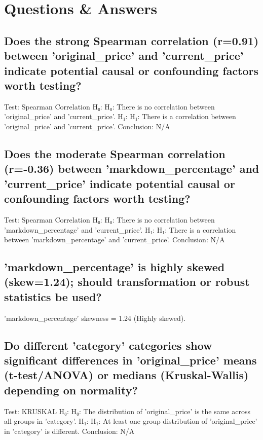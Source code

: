 \documentclass{article}%
\begin{document}
%
\section{Questions \& Answers}%
\label{sec:QuestionsAnswers}%
\subsection{Does the strong Spearman correlation (r=0.91) between 'original\_price' and 'current\_price' indicate potential causal or confounding factors worth testing?}%
\label{subsec:DoesthestrongSpearmancorrelation(r=0.91)betweenoriginalpriceandcurrentpriceindicatepotentialcausalorconfoundingfactorsworthtesting?}%
Test: Spearman Correlation\newline%
H₀: H₀: There is no correlation between 'original\_price' and 'current\_price'.\newline%
H₁: H₁: There is a correlation between 'original\_price' and 'current\_price'.\newline%
Conclusion: N/A

%
\subsection{Does the moderate Spearman correlation (r={-}0.36) between 'markdown\_percentage' and 'current\_price' indicate potential causal or confounding factors worth testing?}%
\label{subsec:DoesthemoderateSpearmancorrelation(r={-}0.36)betweenmarkdownpercentageandcurrentpriceindicatepotentialcausalorconfoundingfactorsworthtesting?}%
Test: Spearman Correlation\newline%
H₀: H₀: There is no correlation between 'markdown\_percentage' and 'current\_price'.\newline%
H₁: H₁: There is a correlation between 'markdown\_percentage' and 'current\_price'.\newline%
Conclusion: N/A

%
\subsection{'markdown\_percentage' is highly skewed (skew=1.24); should transformation or robust statistics be used?}%
\label{subsec:markdownpercentageishighlyskewed(skew=1.24)shouldtransformationorrobuststatisticsbeused?}%
'markdown\_percentage' skewness = 1.24 (Highly skewed).

%
\subsection{Do different 'category' categories show significant differences in 'original\_price' means (t{-}test/ANOVA) or medians (Kruskal{-}Wallis) depending on normality?}%
\label{subsec:Dodifferentcategorycategoriesshowsignificantdifferencesinoriginalpricemeans(t{-}test/ANOVA)ormedians(Kruskal{-}Wallis)dependingonnormality?}%
Test: KRUSKAL\newline%
H₀: H₀: The distribution of 'original\_price' is the same across all groups in 'category'.\newline%
H₁: H₁: At least one group distribution of 'original\_price' in 'category' is different.\newline%
Conclusion: N/A
\end{document}
